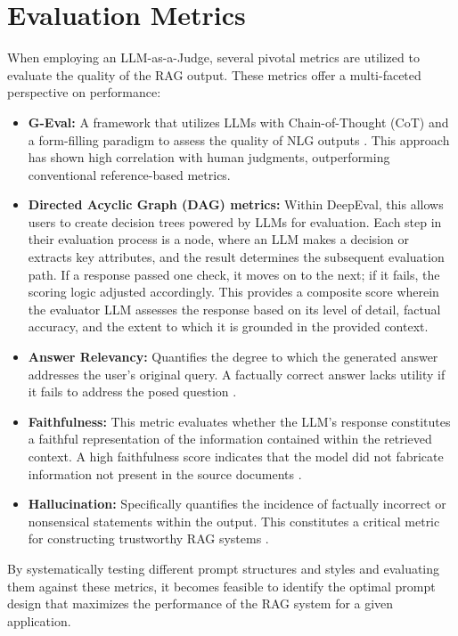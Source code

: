 \section{Evaluation Metrics}
When employing an LLM-as-a-Judge, several pivotal metrics are utilized to evaluate the quality of the RAG output. These metrics offer a multi-faceted perspective on performance:
\begin{itemize}
    \item \textbf{G-Eval:} A framework that utilizes LLMs with Chain-of-Thought (CoT) and a form-filling paradigm to assess the quality of NLG outputs \autocite{liu2023geval}. This approach has shown high correlation with human judgments, outperforming conventional reference-based metrics.
    \item \textbf{Directed Acyclic Graph (DAG) metrics:} Within DeepEval, this allows users to create decision trees powered by LLMs for evaluation. Each step in their evaluation process is a node, where an LLM makes a decision or extracts key attributes, and the result determines the subsequent evaluation path. If a response passed one check, it moves on to the next; if it fails, the scoring logic adjusted accordingly. This provides a composite score wherein the evaluator LLM assesses the response based on its level of detail, factual accuracy, and the extent to which it is grounded in the provided context.
    \item \textbf{Answer Relevancy:} Quantifies the degree to which the generated answer addresses the user's original query. A factually correct answer lacks utility if it fails to address the posed question \autocite{deepeval2023}.
    \item \textbf{Faithfulness:} This metric evaluates whether the LLM's response constitutes a faithful representation of the information contained within the retrieved context. A high faithfulness score indicates that the model did not fabricate information not present in the source documents \autocite{deepeval2023}.
    \item \textbf{Hallucination:} Specifically quantifies the incidence of factually incorrect or nonsensical statements within the output. This constitutes a critical metric for constructing trustworthy RAG systems \autocite{deepeval2023}.
\end{itemize}

By systematically testing different prompt structures and styles and evaluating them against these metrics, it becomes feasible to identify the optimal prompt design that maximizes the performance of the RAG system for a given application.